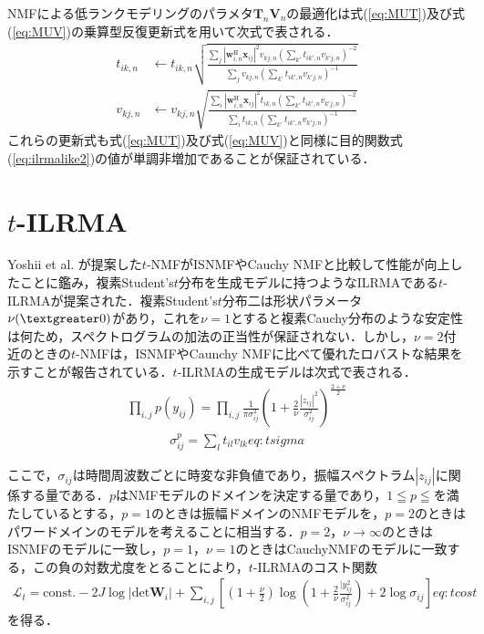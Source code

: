 NMFによる低ランクモデリングのパラメタ$\bm{T}_n\bm{V}_n$の最適化は式(\ref{eq:MUT})及び式(\ref{eq:MUV})の乗算型反復更新式を用いて次式で表される．
\begin{align}
t_{ik, n} &\leftarrow  t_{ik, n} \sqrt{ \frac{ \sum_{j} | \bm{w}_{i,n}^{\mathrm{H}}\bm{x}_{ij} |^2 v_{kj, n} ( \sum_{k'} t_{ik', n} v_{k'j, n} )^{-2} }{ \sum_{j} v_{kj, n} ( \sum_{k'} t_{ik', n} v_{k'j, n} )^{-1} } } \label{eq:t} \\
v_{kj, n} &\leftarrow  v_{kj, n} \sqrt{ \frac{ \sum_{i} | \bm{w}_{i,n}^{\mathrm{H}}\bm{x}_{ij} |^2 t_{ik, n} ( \sum_{k'} t_{ik', n} v_{k'j, n} )^{-2} }{ \sum_{i} t_{ik, n} ( \sum_{k'} t_{ik', n} v_{k'j, n} )^{-1} } } \label{eq:v}
\end{align}
これらの更新式も式(\ref{eq:MUT})及び式(\ref{eq:MUV})と同様に目的関数式(\ref{eq:ilrmalike2})の値が単調非増加であることが保証されている．

\section{$t$-ILRMA}
\label{sec:conv:tilrma}

Yoshii et al. が提案した$t$-NMFがISNMFやCauchy NMFと比較して性能が向上したことに鑑み，複素Student's$t$分布を生成モデルに持つようなILRMAである$t$-ILRMAが提案された．複素Student's$t$分布二は形状パラメータ$\nu(\textgreater0)$があり，これを$\nu=1$とすると複素Cauchy分布のような安定性は何ため，スペクトログラムの加法の正当性が保証されない．しかし，$\nu=2$付近のときの$t$-NMFは，ISNMFやCaunchy NMFに比べて優れたロバストな結果を示すことが報告されている．$t$-ILRMAの生成モデルは次式で表される．
\begin{align}
     \prod_{i,j}p\left(y_{ij}\right)= \prod_{i,j} \frac{1}{\pi \sigma_{ij}^{2} } \left( 1+\frac{2}{\nu}\frac{|z_{ij}|^2}{\sigma_{ij}^{2}} \right)^{\frac{2+\nu}{2}}　\label{eq:tmodel}
\end{align}
\begin{align}
     \sigma_{ij}^{p}=\sum_{l}t_{il}v_{lk}{eq:tsigma}
\end{align}

ここで，$\sigma_{ij}$は時間周波数ごとに時変な非負値であり，振幅スペクトラム$|z_{ij}|$に関係する量である．$p$はNMFモデルのドメインを決定する量であり，$1\leqq p \leqq$を満たしているとする，$p=1$のときは振幅ドメインのNMFモデルを，$p=2$のときはパワードメインのモデルを考えることに相当する．$p=2$，$\nu\rightarrow\infty$のときはISNMFのモデルに一致し，$p=1$，$\nu=1$のときはCauchyNMFのモデルに一致する，この負の対数尤度をとることにより，$t$-ILRMAのコスト関数
\begin{align}
    \mathcal{L}_{t} = \mathrm{const.}-2J\log|\mathrm{det}\bm{W}_{i}|+\sum_{i,j}\left\lbrack\left(1+\frac{\nu}{2}\right)\log\left(1+\frac{2}{\nu}\frac{|y_{ij}^{2}}{\sigma_{ij}^{2}}\right)+2\log\sigma_{ij}\right\rbrack{eq:tcost}
\end{align}
を得る．

